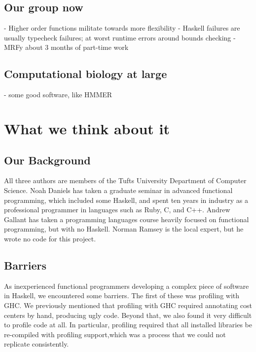 \documentclass[preprint,nonatbib,blockstyle,nocopyrightspace,times]{sigplanconf}
\begin{document}
\subsection{Our group now}
 - Higher order functions militate towards more flexibility
 - Haskell failures are usually typecheck failures; at worst runtime errors around bounds checking
 - MRFy about 3 months of part-time work

\subsection{Computational biology at large}
 - some good software, like HMMER

\section{What we think about it}

\subsection{Our Background}

All three authors are members of the Tufts University Department of Computer
Science.
Noah Daniels has taken a graduate seminar in advanced functional
programming, which included some Haskell, and spent ten years in industry as a
professional programmer in languages such as Ruby, C, and C++.
Andrew Gallant has taken a programming languages course heavily focused on 
functional programming, but with no Haskell.
Norman Ramsey is the local expert, but he wrote no code for this project.

\subsection{Barriers}

As inexperienced functional programmers developing a complex piece of
software in Haskell, we encountered some barriers.
The first of these was profiling with GHC.
We previously mentioned that profiling with GHC required annotating
cost centers by hand, producing ugly code.
Beyond that, we also found it very difficult to profile code at all.
In particular, profiling required that all installed libraries be re-compiled
with profiling support,which was a process that we could not replicate
consistently.
\end{document}
